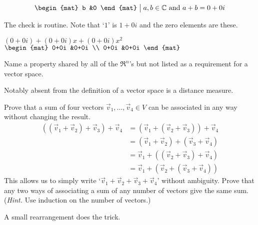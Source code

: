\begin{exercises}
\begin{exparts}
\begin{equation*}
{\begin{mat}
                 b  &0
               \end{mat}\suchthat a,b\in\C\text{\ and\ }
                               a+b=0+0i }
        \end{equation*}
    \end{exparts}
    \begin{answer}
      The check is routine.
      Note that `\( 1 \)' is \( 1+0i \) and the zero elements are these.
      \begin{exparts}
        \partsitem \( (0+0i)+(0+0i)x+(0+0i)x^2 \)
        \partsitem \( \begin{mat}
                   0+0i  &0+0i  \\
                   0+0i  &0+0i
                 \end{mat} \)
      \end{exparts}  
    \end{answer}
  \item 
    Name a property shared by all of the \( \Re^n \)'s 
    but not listed as a
    requirement for a vector space.
    \begin{answer}
      Notably absent from the definition of a vector space is a distance
      measure.  
    \end{answer}
  \recommended \item 
    \begin{exparts}
      \partsitem Prove that a sum of four vectors
        \( \vec{v}_1,\ldots,\vec{v}_4\in V \) can be associated in any way
        without changing the result.
        \begin{align*}
          ((\vec{v}_1+\vec{v}_2)+\vec{v}_3)+\vec{v}_4
          &=(\vec{v}_1+(\vec{v}_2+\vec{v}_3))+\vec{v}_4  \\
          &=(\vec{v}_1+\vec{v}_2)+(\vec{v}_3+\vec{v}_4)  \\
          &=\vec{v}_1+((\vec{v}_2+\vec{v}_3)+\vec{v}_4)  \\
          &=\vec{v}_1+(\vec{v}_2+(\vec{v}_3+\vec{v}_4))
        \end{align*}
        This allows us to simply write
        `\( \vec{v}_1+\vec{v}_2+\vec{v}_3+\vec{v}_4 \)'
        without ambiguity.
      \partsitem Prove that any two ways of associating a sum of any number of
        vectors give the same sum.
        (\textit{Hint.}  Use induction on the number of vectors.)
    \end{exparts}
    \begin{answer}
      \begin{exparts}
        \partsitem A small rearrangement does the trick.

\end{exparts}
\end{answer}
\end{exercises}
